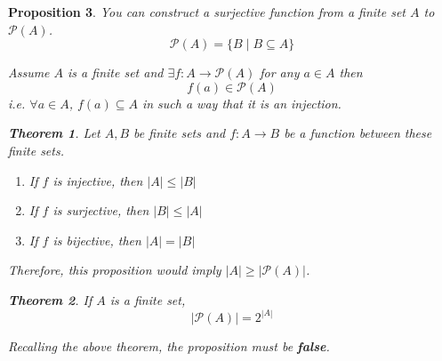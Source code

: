 \documentclass[letterpaper, 12pt]{article}
\newtheorem{theorem}{Theorem}[section]
\newtheorem{proposition}[theorem]{Proposition}
\newenvironment{proof}[1][Proof]{\begin{trivlist}
\item[\hskip \labelsep {\bfseries #1}]}{\end{trivlist}}
\begin{document}
    \begin{proposition}
        You can construct a surjective function from a finite set $A$ to $\mathcal{P}(A)$.
        \[\mathcal{P}(A) = \{B \mid B \subseteq A\}\]
        \begin{proof}
            Assume $A$ is a finite set and $\exists f: A \to \mathcal{P}(A)$ for any $a \in A$ 
            then
            \[f(a) \in \mathcal{P}(A)\]
            i.e. $\forall a \in A$, $f(a) \subseteq A$ in such a way that it is an injection.
            \begin{theorem}
                Let $A, B$ be finite sets and $f: A \to B$ be a function between these finite sets.
                \begin{enumerate}
                    \item If $f$ is injective, then $|A| \le |B|$
                    \item If $f$ is surjective, then $|B| \le |A|$
                    \item If $f$ is bijective, then $|A| = |B|$
                \end{enumerate}
            \end{theorem}
            Therefore, this proposition would imply $|A| \ge |\mathcal{P}(A)|$.
            \begin{theorem}
                If $A$ is a finite set,
                \[|\mathcal{P}(A)| = 2^{|A|}\]
            \end{theorem}
            Recalling the above theorem, the proposition must be \textbf{false}.
        \end{proof}
    \end{proposition}
\end{document}
